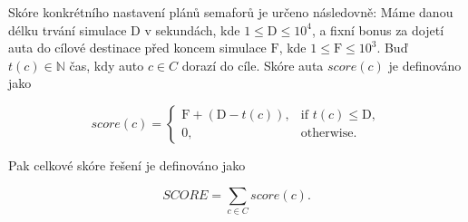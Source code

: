 Skóre konkrétního nastavení plánů semaforů je určeno následovně: Máme danou délku trvání simulace $\mathrm{D}$ v sekundách, kde $1 \leq \mathrm{D} \leq 10^4$, a fixní bonus za dojetí auta do cílové destinace před koncem simulace $\mathrm{F}$, kde $1 \leq \mathrm{F} \leq 10^3$. Buď $t(c) \in \mathbb{N}$ čas, kdy auto $c \in C$ dorazí do cíle. Skóre auta $score(c)$ je definováno jako

\[
score(c) =
\begin{cases}
    \mathrm{F} + (\mathrm{D} - t(c)), & \text{if $t(c) \leq \mathrm{D}$}, \\
    0, & \text{otherwise}.
\end{cases}
\]

Pak celkové skóre řešení je definováno jako

\[
SCORE = \sum_{c \in C} score(c).
\]

%


%

